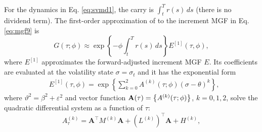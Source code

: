 \documentclass[pdftex,11pt,a4paper] {article}
\begin{document}
For the dynamics in Eq. \eqref{eq:svmd1}, the carry is $\int_t^T r(s)\,ds$ (there is no dividend term). The first-order approximation of \cite{SeppRakhmonoV2023} to the increment MGF in Eq. \eqref{eq:mgf9} is
\begin{equation}  \label{eq:b11}
G(\tau;\phi)\approx\exp\left\{-\phi\int_t^T r(s)\,ds\right\}E^{[1]}(\tau,\phi),
\end{equation}
where $E^{[1]}$ approximates the forward-adjusted increment MGF $E$. Its coefficients are evaluated at the volatility state $\sigma=\sigma_t$ and it has the exponential form
\begin{equation}  \label{eq:b12}
\begin{split}
& E^{[1]}(\tau,\phi)= \exp
\left\{\sum^{2}_{k=0}A^{(k)}(\tau;\phi)(\sigma-\theta)^{k} \right\},
\end{split}%
\end{equation}
where $\vartheta^{2}=\beta^{2}+\varepsilon^{2}$ and vector function $\mathbf{%
A}(\tau)=\left\{A^{(k)}(\tau;\phi)\right\}$, $k=0,1,2$, solve the quadratic
differential system as a function of $\tau$:
\begin{equation}  \label{eq:OrigMGFLogAndQVFirsOrder}
A^{(k)}_\tau=\mathbf{A}^\top M^{(k)}\mathbf{A} + \left(L^{(k)}\right)^\top
\mathbf{A} + H^{(k)},
\end{equation}
\end{document}
